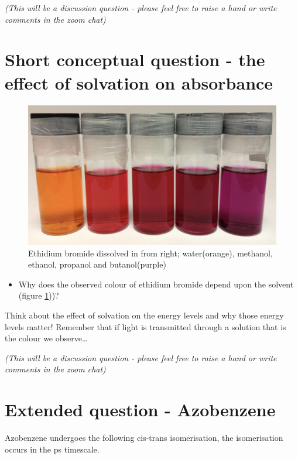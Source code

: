 \documentclass[
]{book}
\providecommand{\tightlist}{%
  \setlength{\itemsep}{0pt}\setlength{\parskip}{0pt}}
\begin{document}
\emph{(This will be a discussion question - please feel free to raise a hand or write comments in the zoom chat)}

\hypertarget{sec:solvationabs}{%
\section{Short conceptual question - the effect of solvation on absorbance}\label{sec:solvationabs}}

\begin{figure}

{\centering \includegraphics[width=0.7\linewidth]{images/ethidium} 

}

\caption{Ethidium bromide dissolved in from right; water(orange), methanol, ethanol, propanol and butanol(purple)}\label{fig:ethidium}
\end{figure}

\begin{itemize}
\tightlist
\item
  Why does the observed colour of ethidium bromide depend upon the solvent (figure \ref{fig:ethidium}))?
\end{itemize}

Think about the effect of solvation on the energy levels and why those energy levels matter! Remember that if light is transmitted through a solution that is the colour we observe\ldots{}

\emph{(This will be a discussion question - please feel free to raise a hand or write comments in the zoom chat)}

\hypertarget{sec:Azobenzene}{%
\section{Extended question - Azobenzene}\label{sec:Azobenzene}}

Azobenzene undergoes the following cis-trans isomerisation, the isomerisation occurs in the ps timescale.
\end{document}
